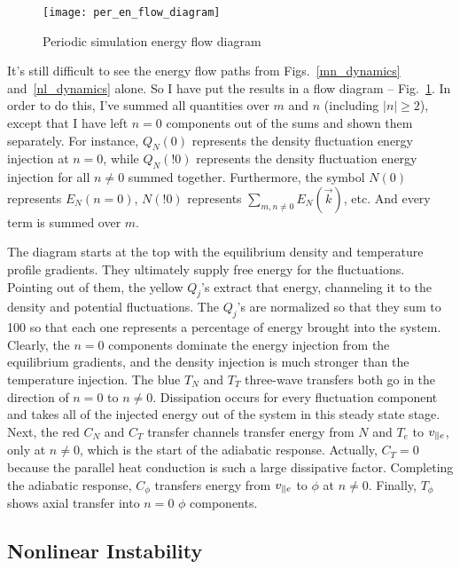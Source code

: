 \begin{figure}[!ht]
\centerline{\texttt{[image: per\_en\_flow\_diagram]}}
\caption{Periodic simulation energy flow diagram}
\label{per_en_flow_diagram}
\end{figure}

It's still difficult to see the energy flow paths from Figs.~\ref{mn_dynamics} and~\ref{nl_dynamics} alone. So I have put the results in a flow diagram -- Fig.~\ref{per_en_flow_diagram}. In order to
do this, I've summed all quantities over $m$ and $n$ (including $|n| \ge 2$), 
except that I have left $n=0$ components out of the sums and shown them separately. For instance, $Q_N(0)$ represents the density fluctuation
energy injection at $n=0$, while $Q_N(!0)$ represents the density fluctuation energy injection for all $n \ne 0$ summed together. Furthermore, the symbol $N(0)$ represents $E_N(n=0)$,
$N(!0)$ represents $\sum_{m,n \ne 0} E_N(\vec{k})$, etc. And every term is summed over $m$.

The diagram starts at the top with the equilibrium density
and temperature profile gradients. They ultimately supply free energy for the fluctuations. Pointing out of them, the yellow $Q_j$'s extract that energy, channeling it
to the density and potential fluctuations. The $Q_j$'s
are normalized so that they sum to 100 so that each one represents a percentage of energy brought into the system. Clearly, the $n=0$ components dominate the energy injection from the equilibrium
gradients, and the density injection is much stronger than the temperature injection. The blue $T_N$ and $T_T$ three-wave transfers both go in the direction of $n=0$ to $n \ne 0$. Dissipation occurs
for every fluctuation component and takes all of the injected energy out of the system in this steady state stage. 
Next, the red $C_N$ and $C_T$ transfer channels transfer energy from $N$ and $T_e$ to $v_{\parallel e}$, only at $n \ne 0$, which is the start of the adiabatic response. Actually,
$C_T = 0$ because the parallel heat conduction is such a large dissipative factor. Completing the adiabatic response, $C_\phi$ transfers energy from $v_{\parallel e}$ to $\phi$ at $n \ne 0$. Finally,
$T_\phi$ shows axial transfer into $n=0$ $\phi$ components.


\subsection{Nonlinear Instability}
\label{ss_nl_inst}

